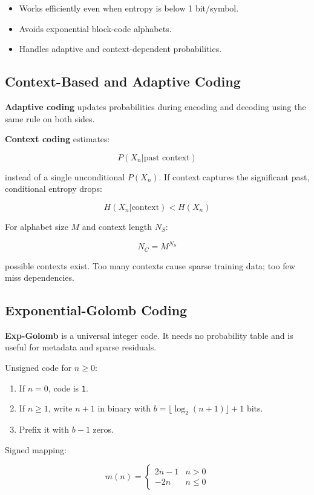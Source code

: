 \begin{itemize}
  \item Works efficiently even when entropy is below 1 bit/symbol.
  \item Avoids exponential block-code alphabets.
  \item Handles adaptive and context-dependent probabilities.
\end{itemize}

\subsection{Context-Based and Adaptive Coding}

\textbf{Adaptive coding} updates probabilities during encoding and decoding using the same rule on both sides.

\textbf{Context coding} estimates:

\[
P(X_n| \text{past context})
\]

instead of a single unconditional $P(X_n)$. If context captures the significant past, conditional entropy drops:

\[
H(X_n|\text{context}) < H(X_n)
\]

For alphabet size $M$ and context length $N_S$:

\[
N_C=M^{N_S}
\]

possible contexts exist. Too many contexts cause sparse training data; too few miss dependencies.

\subsection{Exponential-Golomb Coding}

\textbf{Exp-Golomb} is a universal integer code. It needs no probability table and is useful for metadata and sparse residuals.

Unsigned code for $n\geq0$:

\begin{enumerate}
  \item If $n=0$, code is \texttt{1}.
  \item If $n\geq1$, write $n+1$ in binary with $b=\lfloor\log_2(n+1)\rfloor+1$ bits.
  \item Prefix it with $b-1$ zeros.
\end{enumerate}

Signed mapping:

\[
m(n)=
\begin{cases}
2n-1 & n>0\\
-2n & n\leq0
\end{cases}
\]

